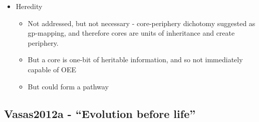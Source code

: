 \begin{itemize}
\begin{itemize}
\begin{itemize}
\begin{itemize}
					\end{itemize}
					\item
					
					Heredity
					
					
					\begin{itemize}
						\item
						
						Not addressed, but not necessary - core-periphery dichotomy
						suggested as gp-mapping, and therefore cores are units of
						inheritance and create periphery.
						
						\item
						
						But a core is one-bit of heritable information, and so not
						immediately capable of OEE
						
						\item
						
						But could form a pathway
						
					\end{itemize}
				\end{itemize}
			\end{itemize}
		\end{itemize}
		
		\hypertarget{vasas2012a---evolution-before-life}{\subsection{Vasas2012a
				- ``Evolution before life''}\label{vasas2012a---evolution-before-life}}
		
